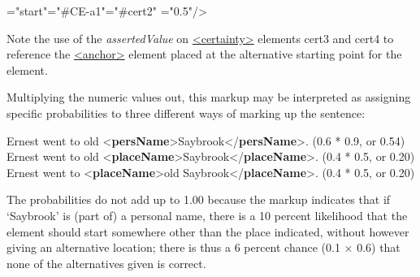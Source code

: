 \begin{shaded}
{\hspace*{1em}{locus}="{start}"\hspace*{1em}{assertedValue}="{\#CE-a1}"\hspace*{1em}{given}="{\#cert2}"\mbox{}\newline 
\hspace*{1em}{degree}="{0.5}"/>}\end{shaded}\egroup\par \noindent  Note the use of the {\itshape assertedValue} on \hyperref[TEI.certainty]{<certainty>} elements cert3 and cert4 to reference the \hyperref[TEI.anchor]{<anchor>} element placed at the alternative starting point for the element.\par
Multiplying the numeric values out, this markup may be interpreted as assigning specific probabilities to three different ways of marking up the sentence: \par\bgroup{}\exampleFont \begin{shaded}\noindent\mbox{}Ernest went to old {<\textbf{persName}>}Saybrook{</\textbf{persName}>}. (0.6 * 0.9, or 0.54)\mbox{}\newline 
 Ernest went to old {<\textbf{placeName}>}Saybrook{</\textbf{placeName}>}. (0.4 * 0.5, or 0.20)\mbox{}\newline 
 Ernest went to {<\textbf{placeName}>}old Saybrook{</\textbf{placeName}>}. (0.4 * 0.5, or 0.20)\end{shaded}\egroup\par \noindent  The probabilities do not add up to 1.00 because the markup indicates that if ‘Saybrook’ is (part of) a personal name, there is a 10 percent likelihood that the element should start somewhere other than the place indicated, without however giving an alternative location; there is thus a 6 percent chance (0.1 × 0.6) that none of the alternatives given is correct.
